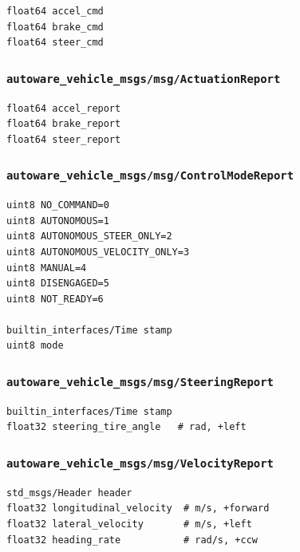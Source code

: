 \documentclass[
]{article}
\begin{document}
\begin{verbatim}
float64 accel_cmd
float64 brake_cmd
float64 steer_cmd
\end{verbatim}

\subsubsection{\texorpdfstring{\texttt{autoware\_vehicle\_msgs/msg/ActuationReport}}{autoware\_vehicle\_msgs/msg/ActuationReport}}\label{autoware_vehicle_msgsmsgactuationreport}

\begin{verbatim}
float64 accel_report
float64 brake_report
float64 steer_report
\end{verbatim}

\subsubsection{\texorpdfstring{\texttt{autoware\_vehicle\_msgs/msg/ControlModeReport}}{autoware\_vehicle\_msgs/msg/ControlModeReport}}\label{autoware_vehicle_msgsmsgcontrolmodereport}

\begin{verbatim}
uint8 NO_COMMAND=0
uint8 AUTONOMOUS=1
uint8 AUTONOMOUS_STEER_ONLY=2
uint8 AUTONOMOUS_VELOCITY_ONLY=3
uint8 MANUAL=4
uint8 DISENGAGED=5
uint8 NOT_READY=6

builtin_interfaces/Time stamp
uint8 mode
\end{verbatim}

\subsubsection{\texorpdfstring{\texttt{autoware\_vehicle\_msgs/msg/SteeringReport}}{autoware\_vehicle\_msgs/msg/SteeringReport}}\label{autoware_vehicle_msgsmsgsteeringreport}

\begin{verbatim}
builtin_interfaces/Time stamp
float32 steering_tire_angle   # rad, +left
\end{verbatim}

\subsubsection{\texorpdfstring{\texttt{autoware\_vehicle\_msgs/msg/VelocityReport}}{autoware\_vehicle\_msgs/msg/VelocityReport}}\label{autoware_vehicle_msgsmsgvelocityreport}

\begin{verbatim}
std_msgs/Header header
float32 longitudinal_velocity  # m/s, +forward
float32 lateral_velocity       # m/s, +left
float32 heading_rate           # rad/s, +ccw
\end{verbatim}
\end{document}
